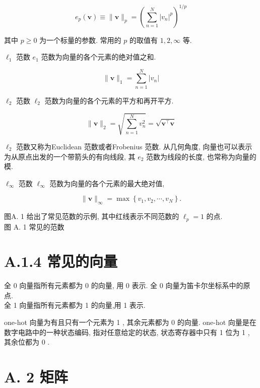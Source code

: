 \documentclass[10pt]{article}
\begin{document}
\begin{equation*}
e_{p}(\boldsymbol{v}) \equiv\|\boldsymbol{v}\|_{p}=\left(\sum_{n=1}^{N}\left|v_{n}\right|^{p}\right)^{1 / p} \tag{A.11}
\end{equation*}


其中 $p \geq 0$ 为一个标量的参数. 常用的 $p$ 的取值有 $1,2, \infty$ 等.

$\ell_{1}$ 范数 $e_{1}$ 范数为向量的各个元素的绝对值之和.


\begin{equation*}
\|\boldsymbol{v}\|_{1}=\sum_{n=1}^{N}\left|v_{n}\right| \tag{A.12}
\end{equation*}


$\ell_{2}$ 范数 $\ell_{2}$ 范数为向量的各个元素的平方和再开平方.


\begin{equation*}
\|\boldsymbol{v}\|_{2}=\sqrt{\sum_{n=1}^{N} v_{n}^{2}}=\sqrt{\boldsymbol{v}^{\top} \boldsymbol{v}} \tag{A.13}
\end{equation*}


$\ell_{2}$ 范数又称为Euclidean 范数或者Frobenius 范数. 从几何角度, 向量也可以表示为从原点出发的一个带箭头的有向线段, 其 $e_{2}$ 范数为线段的长度, 也常称为向量的模.

$\ell_{\infty}$ 范数 $\ell_{\infty}$ 范数为向量的各个元素的最大绝对值,


\begin{equation*}
\|\boldsymbol{v}\|_{\infty}=\max \left\{v_{1}, v_{2}, \cdots, v_{N}\right\} . \tag{A.14}
\end{equation*}


图A. 1 给出了常见范数的示例, 其中红线表示不同范数的 $\ell_{p}=1$ 的点.\\


图 A. 1 常见的范数

\section*{A.1.4 常见的向量}
全 0 向量指所有元素都为 0 的向量, 用 0 表示. 全 0 向量为笛卡尔坐标系中的原点.\\
全 1 向量指所有元素都为 1 的向量,用 1 表示.

one-hot 向量为有且只有一个元素为 1 , 其余元素都为 0 的向量. one-hot 向量是在数字电路中的一种状态编码, 指对任意给定的状态, 状态寄存器中只有 1 位为 1 , 其余位都为 0 .

\section*{A. 2 矩阵}
\end{document}
